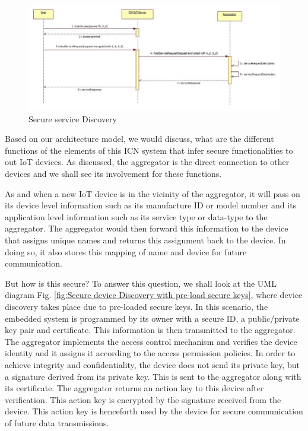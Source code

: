  \begin{figure}[ht]
	\centering
	\includegraphics[width=\linewidth]{Figures/Secure-service-discovery.png}
	\caption[]{Secure service Discovery}
	\label{fig:Secure service Discovery}
\end{figure}
 Based on our architecture model, we would discuss, what are the different functions of the elements of this ICN system that infer secure functionalities to out IoT devices. As discussed, the aggregator is the direct connection to other devices and we shall see its involvement for these functions.\par As and when a new IoT device is in the vicinity of the aggregator, it will pass on its device level information such as its manufacture ID or model number and its application level information such as its service type or data-type to the aggregator. The aggregator would then forward this information to the device that assigns unique names and returns this assignment back to the device. In doing so, it also stores this mapping of name and device for future communication.\par But how is this secure? To answer this question, we shall look at the UML diagram Fig. \ref{fig:Secure device Discovery with pre-load secure keys}, where device discovery takes place due to pre-loaded secure keys. In this scenario, the embedded system is programmed by its owner with a secure ID, a public/private key pair and certificate. This information is then transmitted to the aggregator. The aggregator implements the access control mechanism and verifies the device identity and it assigns it according to the access permission policies. In order to achieve integrity and confidentiality, the device does not send its private key, but a signature derived from its private key. This is sent to the aggregator along with its certificate. The aggregator returns an action key to this device after verification. This action key is encrypted by the signature received from the device. This action key is henceforth used by the device for secure communication of future data transmissions. \par
 
